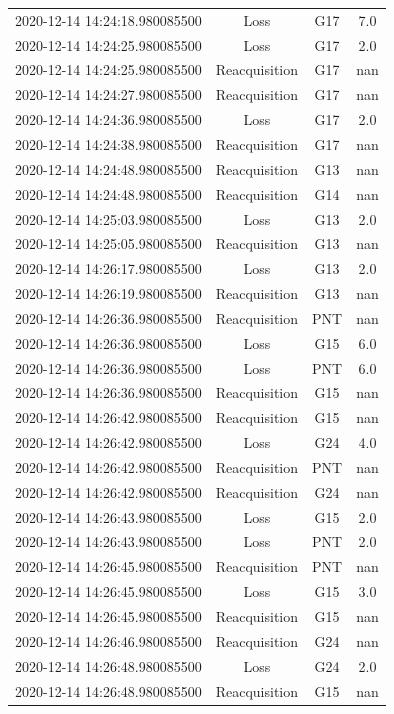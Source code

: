 \begin{enumerate}
\begin{longtabu}{cccc}
2020{-}12{-}14 14:24:18.980085500&Loss&G17&7.0\\%
2020{-}12{-}14 14:24:25.980085500&Loss&G17&2.0\\%
2020{-}12{-}14 14:24:25.980085500&Reacquisition&G17&nan\\%
2020{-}12{-}14 14:24:27.980085500&Reacquisition&G17&nan\\%
2020{-}12{-}14 14:24:36.980085500&Loss&G17&2.0\\%
2020{-}12{-}14 14:24:38.980085500&Reacquisition&G17&nan\\%
2020{-}12{-}14 14:24:48.980085500&Reacquisition&G13&nan\\%
2020{-}12{-}14 14:24:48.980085500&Reacquisition&G14&nan\\%
2020{-}12{-}14 14:25:03.980085500&Loss&G13&2.0\\%
2020{-}12{-}14 14:25:05.980085500&Reacquisition&G13&nan\\%
2020{-}12{-}14 14:26:17.980085500&Loss&G13&2.0\\%
2020{-}12{-}14 14:26:19.980085500&Reacquisition&G13&nan\\%
2020{-}12{-}14 14:26:36.980085500&Reacquisition&PNT&nan\\%
2020{-}12{-}14 14:26:36.980085500&Loss&G15&6.0\\%
2020{-}12{-}14 14:26:36.980085500&Loss&PNT&6.0\\%
2020{-}12{-}14 14:26:36.980085500&Reacquisition&G15&nan\\%
2020{-}12{-}14 14:26:42.980085500&Reacquisition&G15&nan\\%
2020{-}12{-}14 14:26:42.980085500&Loss&G24&4.0\\%
2020{-}12{-}14 14:26:42.980085500&Reacquisition&PNT&nan\\%
2020{-}12{-}14 14:26:42.980085500&Reacquisition&G24&nan\\%
2020{-}12{-}14 14:26:43.980085500&Loss&G15&2.0\\%
2020{-}12{-}14 14:26:43.980085500&Loss&PNT&2.0\\%
2020{-}12{-}14 14:26:45.980085500&Reacquisition&PNT&nan\\%
2020{-}12{-}14 14:26:45.980085500&Loss&G15&3.0\\%
2020{-}12{-}14 14:26:45.980085500&Reacquisition&G15&nan\\%
2020{-}12{-}14 14:26:46.980085500&Reacquisition&G24&nan\\%
2020{-}12{-}14 14:26:48.980085500&Loss&G24&2.0\\%
2020{-}12{-}14 14:26:48.980085500&Reacquisition&G15&nan\\%

\end{longtabu}
\end{enumerate}
